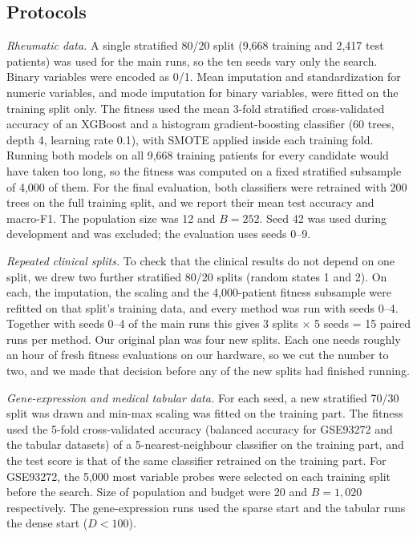 \documentclass[pdflatex,sn-basic]{sn-jnl}
\begin{document}
\subsection{Protocols}
\emph{Rheumatic data.} A single stratified 80/20 split (9,668 training and 2,417 test patients) was used for the main runs, so the ten seeds vary only the search. Binary variables were encoded as 0/1. Mean imputation and standardization for numeric variables, and mode imputation for binary variables, were fitted on the training split only. The fitness used the mean 3-fold stratified cross-validated accuracy of an XGBoost \citep{chen2016xgb} and a histogram gradient-boosting classifier (60 trees, depth 4, learning rate 0.1), with SMOTE \citep{chawla2002} applied inside each training fold. Running both models on all 9,668 training patients for every candidate would have taken too long, so the fitness was computed on a fixed stratified subsample of 4,000 of them. For the final evaluation, both classifiers were retrained with 200 trees on the full training split, and we report their mean test accuracy and macro-F1. The population size was 12 and $B=252$. Seed 42 was used during development and was excluded; the evaluation uses seeds 0--9.

\emph{Repeated clinical splits.} To check that the clinical results do not depend on one split, we drew two further stratified 80/20 splits (random states 1 and 2). On each, the imputation, the scaling and the 4,000-patient fitness subsample were refitted on that split's training data, and every method was run with seeds 0--4. Together with seeds 0--4 of the main runs this gives 3 splits $\times$ 5 seeds = 15 paired runs per method. Our original plan was four new splits. Each one needs roughly an hour of fresh fitness evaluations on our hardware, so we cut the number to two, and we made that decision before any of the new splits had finished running.

\emph{Gene-expression and medical tabular data.} For each seed, a new stratified 70/30 split was drawn and min-max scaling was fitted on the training part. The fitness used the 5-fold cross-validated accuracy (balanced accuracy for GSE93272 and the tabular datasets) of a 5-nearest-neighbour classifier on the training part, and the test score is that of the same classifier retrained on the training part. For GSE93272, the 5,000 most variable probes were selected on each training split before the search. Size of population and budget were 20 and $B=1{,}020$ respectively. The gene-expression runs used the sparse start and the tabular runs the dense start ($D<100$).
\end{document}
